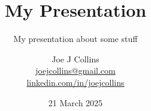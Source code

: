 \documentclass[bigger]{beamer}
\begin{document}
\title{My Presentation}
\subtitle{My presentation about some stuff}
\author{Joe J Collins \\
  \href{mailto:joejcollins@gmail.com}{joejcollins@gmail.com} \\
  \href{https://linkedin.com/in/joejcollins}{linkedin.com/in/joejcollins}
}
\date{21 March 2025}

\begin{frame}[plain]
  \titlepage
\end{frame}
\end{document}

